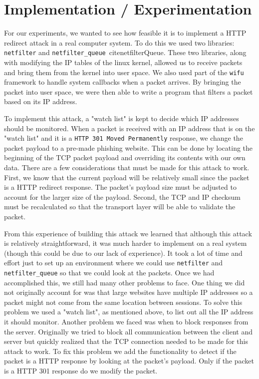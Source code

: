 \documentclass{article}
\begin{document}
\section{Implementation / Experimentation}
For our experiments, we wanted to see how feasible it is to implement a HTTP redirect attack in a real computer system. To do this we used two libraries: \texttt{netfilter} \cite{netfilter} and \texttt{netfilter\_queue}\ cite{netfilterQueue}. These two libraries, along with modifying the IP tables of the linux kernel, allowed us to receive packets and bring them from the kernel into user space. We also used part of the \texttt{wifu}\cite{wifu} framework to handle system callbacks when a packet arrives. By bringing the packet into user space, we were then able to write a program that filters a packet based on its IP address. 

To implement this attack, a "watch list" is kept to decide which IP addresses should be monitored. When a packet is received with an IP address that is on the "watch list" and it is a \texttt{HTTP 301 Moved Permanently} response, we change the packet payload to a pre-made phishing website. This can be done by locating the beginning of the TCP packet payload and overriding its contents with our own data. There are a few considerations that must be made for this attack to work. First, we know that the current payload will be relatively small since the packet is a HTTP redirect response. The packet's payload size must be adjusted to account for the larger size of the payload. Second, the TCP and IP checksum must be recalculated so that the transport layer will be able to validate the packet.

From this experience of building this attack we learned that although this attack is relatively straightforward, it was much harder to implement on a real system (though this could be due to our lack of experience). It took a lot of time and effort just to set up an environment where we could use \texttt{netfilter} and \texttt{netfilter\_queue} so that we could look at the packets. Once we had accomplished this, we still had many other problems to face. One thing we did not originally account for was that large websites have multiple IP addresses so a packet might not come from the same location between sessions. To solve this problem we used a "watch list", as mentioned above, to list out all the IP address it should monitor. Another problem we faced was when to block responses from the server. Originally we tried to block all communication between the client and server but quickly realized that the TCP connection needed to be made for this attack to work. To fix this problem we add the functionality to detect if the packet is a HTTP response by looking at the packet's payload. Only if the packet is a HTTP 301 response do we modify the packet.
\end{document}
